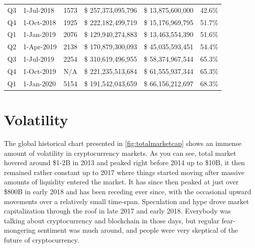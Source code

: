 \begin{table}[ht]
\begin{tabular}{@{}lllllr@{}}
Q3       & 1-Jul-2018     & 1573          & \$     257,373,095,796    & \$        13,875,600,000      & 42.6\% \\
Q4       & 1-Oct-2018     & 1925          & \$     222,182,499,719    & \$        15,176,969,795      & 51.7\% \\
Q1       & 1-Jan-2019     & 2076          & \$     129,940,274,883    & \$        13,463,554,390      & 51.6\% \\
Q2       & 1-Apr-2019     & 2138          & \$     170,879,300,093    & \$          45,035,593,451    & 54.4\%  \\
Q3       & 1-Jul-2019     & 2254          & \$     310,619,496,955    & \$           58,374,967,544   & 65.3\%  \\
Q4       & 1-Oct-2019     & N/A          & \$      221,235,513,684    & \$           61,555,937,344   & 65.3\% \\
Q1       & 1-Jan-2020     & 5154          & \$     191,542,043,659    & \$            66,156,212,697   & 68.3\% \\

\bottomrule
\end{tabular}
\label{tab:historicalmarketcap}
\end{table}

\section{Volatility}
The global historical chart presented in  \cref{fig:totalmarketcap} shows an immense amount of volatility in cryptocurrency markets. As you can see, total market hovered around \$1-2B in 2013 and peaked right before 2014 up to \$10B, it then remained rather constant up to 2017 where things started moving after massive amounts of liquidity entered the market. It has since then peaked at just over \$800B in early 2018 and has been receding ever since, with the occasional upward movements over a relatively small time-span. Speculation and hype drove market capitalization through the roof in late 2017 and early 2018. Everybody was talking about cryptocurrency and blockchain in those days, but regular fear-mongering sentiment was much around, and people were very skeptical of the future of cryptocurrency.
 
